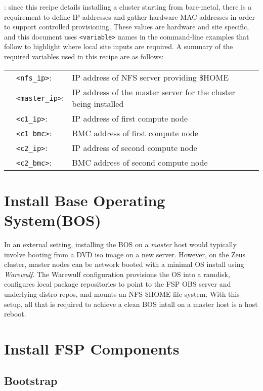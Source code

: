 \documentclass[letterpaper]{article}
\begin{document}
: since this recipe details installing a cluster
starting from bare-metal, there is a requirement to define IP addresses and gather
hardware MAC addresses in order to support controlled provisioning. These values
are hardware and site specific, and this document uses \texttt{<variable>}
names in the command-line examples that follow to highlight where local site
inputs are required. A summary of the required variables used in this recipe
are as follows:

\vspace*{0.2cm}
\begin{tabular}{@{}>{\textbullet}cll@{}}
& \texttt{<nfs\_ip>}:    & IP address of NFS server providing \$HOME \\
& \texttt{<master\_ip>}: & IP address of the master server for the cluster
  being installed\\
& \texttt{<c1\_ip>}:     & IP address of first compute node \\
& \texttt{<c1\_bmc>}:    & BMC address of first compute node \\
& \texttt{<c2\_ip>}:     & IP address of second compute node \\
& \texttt{<c2\_bmc>}:    & BMC address of second compute node \\
\end{tabular}

\section{Install Base Operating System(BOS)}

In an external setting, installing the BOS on a {\em master} host would
typically involve booting from a DVD iso image on a new server.  However, on
the Zeus cluster, master nodes can be network booted with a minimal OS
install using {\em Warewulf}. The Warewulf configuration provisions the OS into
a ramdisk, configures local package repositories to point to the FSP OBS server and
underlying distro repos, and mounts an NFS \$HOME file system. With this setup,
all that is required to achieve a clean BOS intall on a master host is a host
reboot. 

\section{Install FSP Components}

\subsection{Bootstrap}
\end{document}
